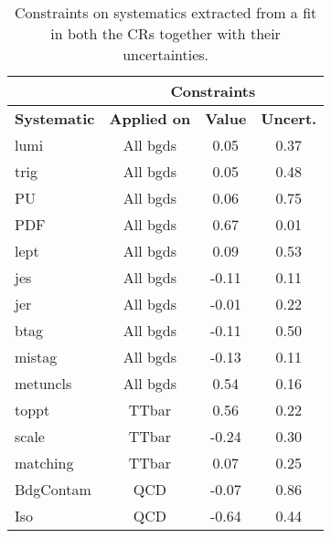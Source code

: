\documentclass[10pt]{article}
\begin{document}
\begin{table}[!ht]
\begin{center}
\begin{tabular}{|l|c|c|c|}
\hline
\hline
& \multicolumn{3}{c|}{\textbf{Constraints}} \\
\hline
\hline
\textbf{Systematic} & \textbf{Applied on} & \textbf{Value} & \textbf{Uncert.}\\
\hline
lumi            & All bgds  & 0.05    & 0.37   \\
trig            & All bgds  & 0.05    & 0.48   \\
PU              & All bgds  & 0.06    & 0.75   \\
PDF             & All bgds  & 0.67    & 0.01   \\
lept            & All bgds  & 0.09    & 0.53   \\
jes             & All bgds  & -0.11   & 0.11   \\
jer             & All bgds  & -0.01   & 0.22   \\
btag            & All bgds  & -0.11   & 0.50   \\
mistag          & All bgds  & -0.13   & 0.11   \\
metuncls        & All bgds  & 0.54    & 0.16   \\
toppt           & TTbar     & 0.56    & 0.22   \\
scale           & TTbar     & -0.24   & 0.30   \\
matching        & TTbar     &  0.07   & 0.25   \\
BdgContam       & QCD       & -0.07   & 0.86   \\
Iso             & QCD       & -0.64   & 0.44   \\
\hline
\hline

\hline
\hline
\end{tabular}
\caption{Constraints on systematics extracted from a fit in both the CRs together with their uncertainties.}
\label{tab:SFtable}
\end{center}
\end{table} 
\end{document}
